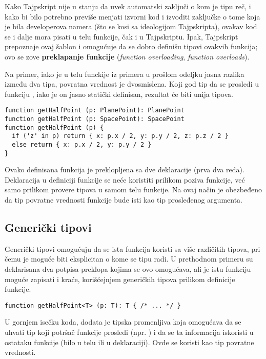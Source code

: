 Kako Tajpskript nije u stanju da uvek automatski zaključi o kom je tipu reč, i kako bi bilo potrebno previše menjati izvorni kod i izvoditi zaključke o tome koja je bila developerova namera (što se kosi sa ideologijom Tajpskripta), ovakav kod se i dalje mora pisati u telu funkcije, čak i u Tajpskriptu.
Ipak, Tajpskript prepoznaje ovaj šablon i omogućuje da se dobro definišu tipovi ovakvih funkcija; ovo se zove \textbf{preklapanje funkcije} (\textsl{function overloading}, \textsl{function overloads}).

Na primer, iako je u telu funckije iz primera u prošlom odeljku jasna razlika između dva tipa, povratna vrednost je dvosmislena.
Koji god tip da se prosledi u funkciju , iako je on jasno statički definisan, rezultat će biti unija tipova.

\begin{verbatim}
function getHalfPoint (p: PlanePoint): PlanePoint
function getHalfPoint (p: SpacePoint): SpacePoint
function getHalfPoint (p) {
  if ('z' in p) return { x: p.x / 2, y: p.y / 2, z: p.z / 2 }
  else return { x: p.x / 2, y: p.y / 2 }
}
\end{verbatim}

Ovako definisana funkcija je preklopljena sa dve deklaracije (prva dva reda).
Deklaracija u definiciji funkcije se neće koristiti prilikom poziva funkcije, već samo prilikom provere tipova u samom telu funkcije.
Na ovaj način je obezbeđeno da tip povratne vrednosti funkcije bude isti kao tip prosleđenog argumenta.

\subsection{Generički tipovi}

Generički tipovi omogućuju da se ista funkcija koristi sa više različitih tipova, pri čemu je moguće biti eksplicitan o kome se tipu radi.
U prethodnom primeru su deklarisana dva potpisa-preklopa kojima se ovo omogućava, ali je istu funkciju moguće zapisati i kraće, korišćejnjem generičkih tipova prilikom definicije funkcije.

\begin{verbatim}
function getHalfPoint<T> (p: T): T { /* ... */ }
\end{verbatim}

U gornjem isečku koda, dodata je tipska promenljiva  koja omogućava da se uhvati tip koji potršač funkcije prosledi (npr. ) i da se ta informacija iskoristi u ostataku funkcije (bilo u telu ili u deklaraciji).
Ovde se  koristi kao tip povratne vrednosti.


